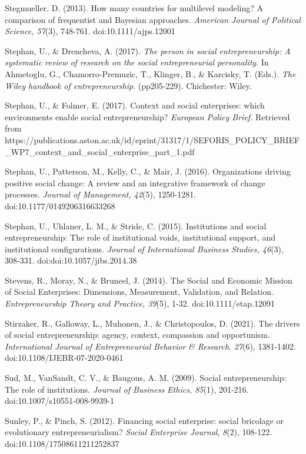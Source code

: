 \documentclass{article}
\begin{document}
Stegmueller, D. (2013). How many countries for multilevel modeling? A comparison of frequentist and Bayesian approaches. \emph{American Journal of Political Science, 57}(3), 748-761. doi:10.1111/ajps.12001

Stephan, U., \& Drencheva, A. (2017). \emph{The person in social entrepreneurship: A systematic review of research on the social entrepreneurial personality}. In Ahmetoglu, G., Chamorro-Premuzic, T., Klinger, B., \& Karcisky, T. (Eds.). \emph{The Wiley handbook of entrepreneurship}. (pp205-229). Chichester: Wiley. 

Stephan, U., \& Folmer, E. (2017). Context and social enterprises: which environments enable social entrepreneurship? \emph{European Policy Brief. }Retrieved from https://publications.aston.ac.uk/id/eprint/31317/1/SEFORIS\_POLICY\_BRIEF\_WP7\_context\_and\_social\_enterprise\_part\_1.pdf

Stephan, U., Patterson, M., Kelly, C., \& Mair, J. (2016). Organizations driving positive social change: A review and an integrative framework of change processes. \emph{Journal of Management, 42}(5), 1250-1281. doi:10.1177/0149206316633268

Stephan, U., Uhlaner, L. M., \& Stride, C. (2015). Institutions and social entrepreneurship: The role of institutional voids, institutional support, and institutional configurations. \emph{Journal of International Business Studies, 46}(3), 308-331. doi:doi:10.1057/jibs.2014.38

Stevens, R., Moray, N., \& Bruneel, J. (2014). The Social and Economic Mission of Social Enterprises: Dimensions, Measurement, Validation, and Relation. \emph{Entrepreneurship Theory and Practice, 39}(5), 1-32. doi:10.1111/etap.12091

Stirzaker, R., Galloway, L., Muhonen, J., \& Christopoulos, D. (2021). The drivers of social entrepreneurship: agency, context, compassion and opportunism. \emph{International Journal of Entrepreneurial }\emph{Behavior}\emph{ \& Research}. \emph{27}(6), 1381-1402. doi:10.1108/IJEBR-07-2020-0461

Sud, M., VanSandt, C. V., \& Baugous, A. M. (2009). Social entrepreneurship: The role of institutions. \emph{Journal of Business Ethics, 85}(1), 201-216. doi:10.1007/s10551-008-9939-1

Sunley, P., \& Pinch, S. (2012). Financing social enterprise: social bricolage or evolutionary entrepreneurialism? \emph{Social Enterprise Journal}, \emph{8}(2), 108-122. doi:10.1108/17508611211252837
\end{document}
